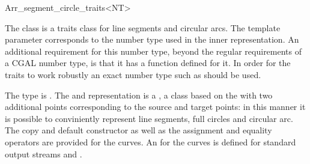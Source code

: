 
\ccRefPageBegin

\begin{ccRefClass}{Arr_segment_circle_traits<NT>}

\ccDefinition
    The class  is a traits class
    for line segments and circular arcs. The template parameter 
    corresponds to the number type used in the inner representation.
    An additional requirement for this number type, beyond the regular
    requirements of a CGAL number type, is that it has a 
    function defined for it. In order for the traits to work robustly
    an exact number type such as  should be used.

    The  type is . The  
     and 
    representation is a , a class
    based on the 
    with two additional points corresponding to the source and target points:
    in this manner it is possible to conviniently represent line segments,
    full circles and circular arc.
    The copy and default constructor as well as the
    assignment and equality operators are provided for the curves. 
    An  for the curves is defined for
    standard output streams and .



\ccIsModel
     

\end{ccRefClass} %

\ccRefPageEnd

